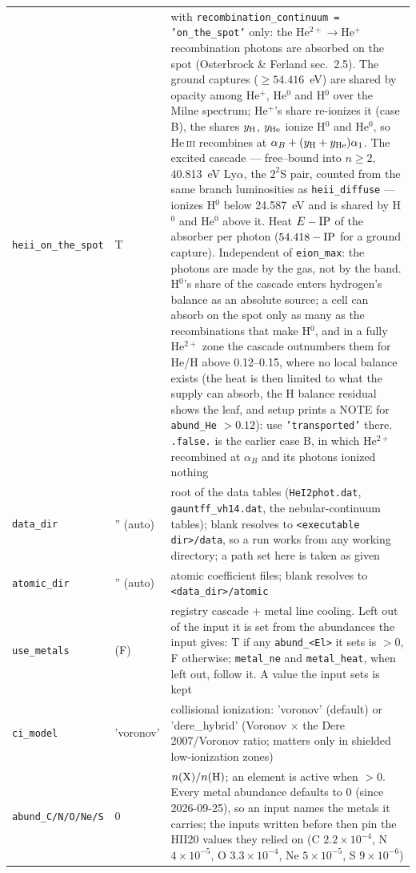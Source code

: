 \documentclass[english,a4paper]{my_memo}
\newcommand{\code}[1]{\texttt{#1}}
\begin{document}
{\begin{longtable}{llp{7.2cm}}
\code{heii\_on\_the\_spot} & T & with \code{recombination\_continuum = 'on\_the\_spot'} only: the He$^{2+}\to$He$^+$ recombination photons are absorbed on the spot (Osterbrock \& Ferland sec.~2.5).  The ground captures ($\ge54.416$~eV) are shared by opacity among He$^+$, He$^0$ and H$^0$ over the Milne spectrum; He$^+$'s share re-ionizes it (case B), the shares $y_{\rm H}$, $y_{\rm He}$ ionize H$^0$ and He$^0$, so He\,\textsc{iii} recombines at $\alpha_B + (y_{\rm H}+y_{\rm He})\alpha_1$.  The excited cascade --- free--bound into $n\ge2$, 40.813~eV Ly$\alpha$, the $2^2$S pair, counted from the same branch luminosities as \code{heii\_diffuse} --- ionizes H$^0$ below 24.587~eV and is shared by H$^0$ and He$^0$ above it.  Heat $E-{\rm IP}$ of the absorber per photon ($54.418-{\rm IP}$ for a ground capture).  Independent of \code{eion\_max}: the photons are made by the gas, not by the band.  H$^0$'s share of the cascade enters hydrogen's balance as an absolute source; a cell can absorb on the spot only as many as the recombinations that make H$^0$, and in a fully He$^{2+}$ zone the cascade outnumbers them for He/H above 0.12--0.15, where no local balance exists (the heat is then limited to what the supply can absorb, the H balance residual shows the leaf, and setup prints a NOTE for \code{abund\_He} $>0.12$): use \code{'transported'} there.  \code{.false.} is the earlier case B, in which He$^{2+}$ recombined at $\alpha_B$ and its photons ionized nothing \\
\code{data\_dir} & '' (auto) & root of the data tables (\code{HeI2phot.dat}, \code{gauntff\_vh14.dat}, the nebular-continuum tables); blank resolves to \code{<executable dir>/data}, so a run works from any working directory; a path set here is taken as given \\
\code{atomic\_dir} & '' (auto) & atomic coefficient files; blank resolves to \code{<data\_dir>/atomic} \\
\code{use\_metals} & (F) & registry cascade + metal line cooling.  Left out of the input it is set from the abundances the input gives: T if any \code{abund\_<El>} it sets is $>0$, F otherwise; \code{metal\_ne} and \code{metal\_heat}, when left out, follow it.  A value the input sets is kept \\
\code{ci\_model} & 'voronov' & collisional ionization: 'voronov' (default) or 'dere\_hybrid' (Voronov $\times$ the Dere 2007/Voronov ratio; matters only in shielded low-ionization zones) \\
\code{abund\_C/N/O/Ne/S} & 0 & $n({\rm X})/n({\rm H})$; an element is active when $>0$.  Every metal abundance defaults to 0 (since 2026-09-25), so an input names the metals it carries; the inputs written before then pin the HII20 values they relied on (C $2.2\times10^{-4}$, N $4\times10^{-5}$, O $3.3\times10^{-4}$, Ne $5\times10^{-5}$, S $9\times10^{-6}$) \\

\end{longtable}}
\end{document}
